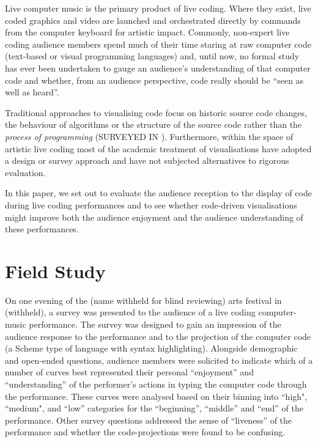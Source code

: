 \documentclass{sig-alternate}
\begin{document}
Live computer music is the primary product of live coding. Where they exist, live coded graphics and video are launched and orchestrated directly by commands from the computer keyboard for artistic impact. Commonly, non-expert live coding audience members spend much of their time staring at raw computer code (text-based or visual programming languages) and, until now, no formal study has ever been undertaken to gauge an audience's understanding of that computer code and whether, from an audience perspective, code really should be ``seen as well as heard''.

Traditional approaches to visualising code focus on historic source code changes, the behaviour of algorithms or the structure of the source code rather than the {\it process of programming} (SURVEYED IN \cite{Novais2013}). Furthermore, within the space of  artistic live coding most of the academic treatment of visualisations have adopted a design or survey approach \cite{McLean2010b,Magnusson2013} and have not subjected alternatives to rigorous evaluation.

In this paper, we set out to evaluate the audience reception to the display of code during live coding performances and to see whether code-driven visualisations might improve both the audience enjoyment and the audience understanding of these performances.

\section{Field Study}

On one evening of the (name withheld for blind reviewing) arts festival in (withheld), a survey was presented to the audience of a live coding computer-music performance. The survey was designed to gain an impression of the audience response to the performance and to the projection of the computer code (a Scheme type of language with syntax highlighting). Alongside demographic and open-ended questions, audience members were solicited to indicate which of a number of curves best represented their personal ``enjoyment'' and ``understanding'' of the performer's actions in typing the computer code through the performance. These curves were analysed based on their binning into ``high", ``medium", and ``low'' categories for the ``beginning'', ``middle'' and ``end'' of the performance. Other survey questions addressed the sense of ``liveness'' of the performance \cite{Auslander} and whether the code-projections were found to be confusing.
\end{document}
